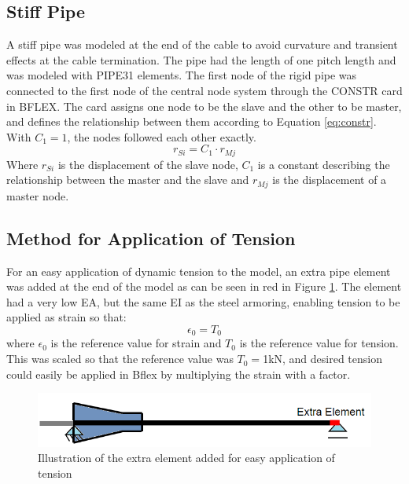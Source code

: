 \subsection{Stiff Pipe}
A stiff pipe was modeled at the end of the cable to avoid curvature and transient effects at the cable termination. The pipe had the length of one pitch length and was modeled with PIPE31 elements. The first node of the rigid pipe was connected to the first node of the central node system through the CONSTR card in BFLEX. The card assigns one node to be the slave and the other to be master, and defines the relationship between them according to Equation \ref{eq:constr}. With $C_1=1$, the nodes followed each other exactly. 
\begin{equation}
r_{Si}=C_1 \cdot r_{Mj}   
\label{eq:constr} 
\end{equation}
Where $r_{Si}$ is the displacement of the slave node,  $C_1$ is a constant describing the relationship between the master and the slave and $r_{Mj}$ is the displacement of a master node.\newline 
\newline 
\subsection{Method for Application of Tension}
\noindent For an easy application of dynamic tension to the model, an extra pipe element was added at the end of the model as can be seen in red in Figure \ref{fig:exelem}. The element had a very low EA, but the same EI as the steel armoring, enabling tension to be applied as strain so that:
\begin{equation}
    \epsilon_0 = T_0
\end{equation}
where $\epsilon_0$ is the reference value for strain and $T_0$ is the reference value for tension. This was scaled so that the reference value was $T_0=$1kN, and desired tension could easily be applied in Bflex by multiplying the strain with a factor. 
\begin{figure}[H]
\centering
\includegraphics[scale=0.8]{figures/exelem}
\caption[Illustration of the extra element added for easy application of tension]{Illustration of the extra element added for easy application of tension}
 \label{fig:exelem}
\end{figure}

